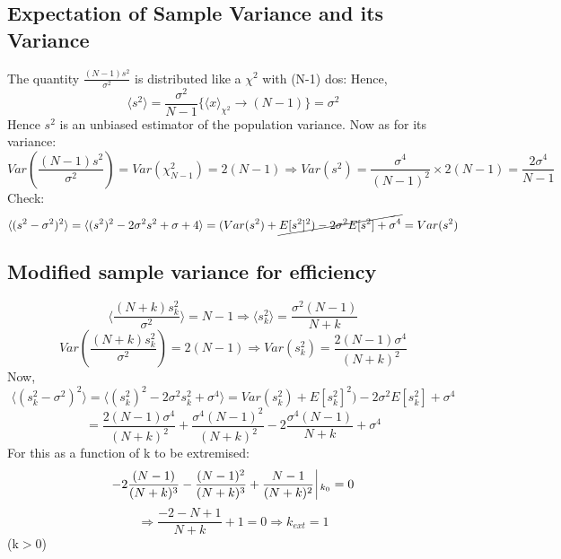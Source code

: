 \documentclass[11pt]{article}
\begin{document}
	\subsection{Expectation of Sample Variance and its Variance}
	
	 The quantity $\frac{(N-1)s^2}{\sigma^2}$ is distributed like a $\chi^2$ with (N-1) dos:
	 Hence,
	\[
		\boxed{\langle s^2 \rangle = \frac{\sigma^2}{N-1}\{\langle x\rangle_{\chi^2}\rightarrow (N-1)\} = \sigma^2}
	\]
	Hence $s^2$ is an unbiased estimator of the population variance.
	Now as for its variance:
	\[
		Var(\frac{(N-1)s^2}{\sigma^2}) = Var(\chi^2_{N-1}) = 2(N-1) \Rightarrow \boxed{Var(s^2) = \frac{\sigma^4}{(N-1)^2}\times 2(N-1) = \frac{2\sigma^4}{N-1}}
	\]
	Check:
	\[
		\langle (s^2-\sigma^2)^2\rangle = \langle (s^2)^2 -2\sigma^2 s^2 + \sigma+4  \rangle = (Var(s^2)+\cancel{E[s^2]^2) -2\sigma^2E[s^2] + \sigma^4} = Var(s^2)
	\]
	
	\subsection{Modified sample variance for efficiency}
	
	\[
		\langle \frac{(N+k)s_k^2}{\sigma^2}\rangle = N-1 \Rightarrow \boxed{\langle s_k^2\rangle = \frac{\sigma^2(N-1)}{N+k}}
 	\]
	\[
		Var(\frac{(N+k)s_k^2}{\sigma^2}) = 2(N-1) \Rightarrow \boxed{Var(s_k^2) = \frac{2(N-1)\sigma^4}{(N+k)^2}}
	\]
	Now,
	\[
		\boxed{\langle (s_k^2 - \sigma^2)^2 \rangle}  = \langle (s_k^2)^2  - 2\sigma^2 s_k^2 + \sigma^4 \rangle = Var(s_k^2) + E[s_k^2]^2)  - 2\sigma^2 E[s_k^2] + \sigma^4
	\]
	\[
		= \boxed{\frac{2(N-1)\sigma^4}{(N+k)^2} + \frac{\sigma^4(N-1)^2}{(N+k)^2} - 2\frac{\sigma^4(N-1)}{N+k} + \sigma^4}
	\]
	For this as a function of k to be extremised:
	\[
		-2\frac{(N-1)}{(N+k)^3} - \frac{(N-1)^2}{(N+k)^3} + \frac{N-1}{(N+k)^2} \, \vline_{\, \, k_0} = 0
	\]
	\[
		\Rightarrow \frac{-2-N+1}{N+k} + 1 = 0 \Rightarrow \boxed{ k_{ext} = 1}
	\](k$>0$)
	
\end{document}
